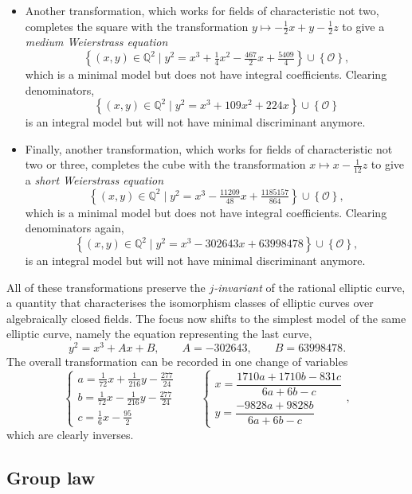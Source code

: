 \documentclass{article}
\newcommand{\rb}[1]{\left( #1 \right)}
\newcommand{\cb}[1]{\left\{ #1 \right\}}
\newcommand{\Q}{\mathbb{Q}}
\newcommand{\OO}{\mathcal{O}}
\begin{document}
\begin{itemize}
\item Another transformation, which works for fields of characteristic not two, completes the square with the transformation $ y \mapsto -\tfrac{1}{2}x + y - \tfrac{1}{2}z $ to give a \emph{medium Weierstrass equation}
$$ \cb{\rb{x, y} \in \Q^2 \mid y^2 = x^3 + \tfrac{1}{4}x^2 - \tfrac{467}{2}x + \tfrac{5409}{4}} \cup \cb{\OO}, $$
which is a minimal model but does not have integral coefficients. Clearing denominators,
$$ \cb{\rb{x, y} \in \Q^2 \mid y^2 = x^3 + 109x^2 + 224x} \cup \cb{\OO} $$
is an integral model but will not have minimal discriminant anymore.
\item Finally, another transformation, which works for fields of characteristic not two or three, completes the cube with the transformation $ x \mapsto x - \tfrac{1}{12}z $ to give a \emph{short Weierstrass equation}
$$ \cb{\rb{x, y} \in \Q^2 \mid y^2 = x^3 - \tfrac{11209}{48}x + \tfrac{1185157}{864}} \cup \cb{\OO}, $$
which is a minimal model but does not have integral coefficients. Clearing denominators again,
$$ \cb{\rb{x, y} \in \Q^2 \mid y^2 = x^3 - 302643x + 63998478} \cup \cb{\OO}, $$
is an integral model but will not have minimal discriminant anymore.
\end{itemize}
All of these transformations preserve the \emph{$ j $-invariant} of the rational elliptic curve, a quantity that characterises the isomorphism classes of elliptic curves over algebraically closed fields. The focus now shifts to the simplest model of the same elliptic curve, namely the equation representing the last curve,
\begin{equation}
\label{elliptic}
y^2 = x^3 + Ax + B, \qquad A = -302643, \qquad B = 63998478.
\end{equation}
The overall transformation can be recorded in one change of variables
$$
\begin{cases}
a = \tfrac{1}{72}x + \tfrac{1}{216}y - \tfrac{277}{24} \\
b = \tfrac{1}{72}x - \tfrac{1}{216}y - \tfrac{277}{24} \\
c = \tfrac{1}{6}x - \tfrac{95}{2}
\end{cases}
\qquad
\begin{cases}
x = \dfrac{1710a + 1710b - 831c}{6a + 6b - c} \\
y = \dfrac{-9828a + 9828b}{6a + 6b - c}
\end{cases},
$$
which are clearly inverses.

\subsection{Group law}
\end{document}
